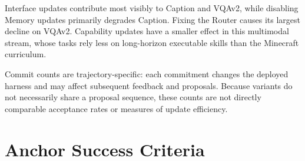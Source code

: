 \documentclass{article}
\begin{document}
\begin{table}[H]
\centering
\small
\caption{
Full component-ablation results on the controlled multimodal stream.
``Committed'' counts candidate updates entering the persistent harness.
}
\label{tab:component_ablation_full}
\end{table}

Interface updates contribute most visibly to Caption and VQAv2, while
disabling Memory updates primarily degrades Caption. Fixing the Router causes
its largest decline on VQAv2. Capability updates have a smaller effect in this
multimodal stream, whose tasks rely less on long-horizon executable skills
than the Minecraft curriculum.

Commit counts are trajectory-specific: each commitment changes the deployed
harness and may affect subsequent feedback and proposals. Because variants do
not necessarily share a proposal sequence, these counts are not directly
comparable acceptance rates or measures of update efficiency.

\section{Anchor Success Criteria}
\label{app:anchor_criteria}
\end{document}
